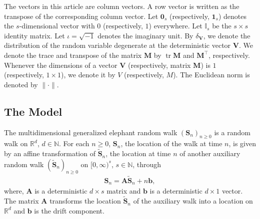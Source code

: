 \documentclass[12pt]{amsart}
\theoremstyle{plain}
\theoremstyle{remark}
\numberwithin{equation}{section}
\begin{document}
The vectors in this article are column vectors. A row vector is written as the transpose of the corresponding column vector. Let $\boldsymbol{0}_s$ (respectively, $\boldsymbol{1}_s$) denotes the $s$-dimensional vector with $0$ (respectively, $1$) everywhere. Let $\mathbb{I}_s$ be the $s\times s$ identity matrix. Let $\iota = \sqrt{-1}$ denotes the imaginary unit. By $\delta_{\boldsymbol{V}}$, we denote the distribution of the random variable degenerate at the deterministic vector $\boldsymbol{V}$. We denote the trace and transpose of the matrix $\boldsymbol{M}$ by $\operatorname{tr} \boldsymbol{M}$ and $\boldsymbol{M}^{\top}$, respectively. Whenever the dimensions of a vector $\boldsymbol{V}$ (respectively, matrix $\boldsymbol{M}$) is $1$ (respectively, $1 \times 1$), we denote it by $V$ (respectively, $M$). The Euclidean norm is denoted by $\|\cdot\|$.

\subsection{The Model}\label{subsec:model-gerw}

The multidimensional generalized elephant random walk $\left(\boldsymbol{S}_n\right)_{n\geq0}$ is a random walk on $\mathbb{R}^d$, $d \in \mathbb{N}$. For each $n \geq 0$, $\boldsymbol{S}_n$, the location of the walk at time $n$, is given by an affine transformation of $\boldsymbol{\widetilde{S}}_n$, the location at time $n$ of another auxiliary random walk $(\boldsymbol{\widetilde{S}}_n)_{n\geq0}$ on $[0,\infty)^{s}$, $s \in \mathbb{N}$, through 
\begin{align}\label{eq22}
    \boldsymbol{S}_n = \boldsymbol{A}\boldsymbol{\widetilde{S}}_n + n\boldsymbol{b},
\end{align}
where, $\boldsymbol{A}$ is a deterministic $d \times s$ matrix and $\boldsymbol{b}$ is a deterministic $d\times 1$ vector. The matrix $\boldsymbol{A}$ transforms the location $\boldsymbol{\widetilde{S}}_n$ of the auxiliary walk into a location on $\mathbb{R}^d$ and $\boldsymbol{b}$ is the drift component. %
\end{document}
